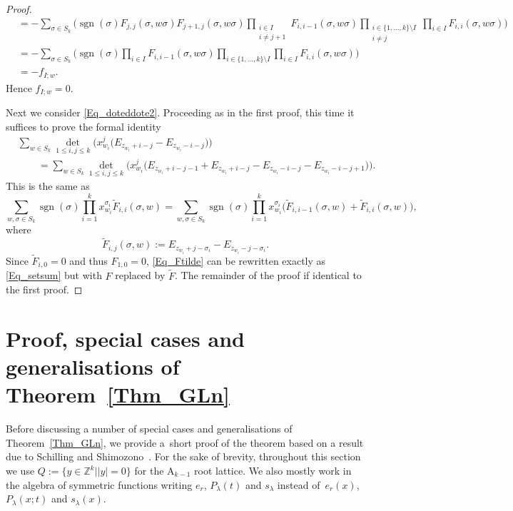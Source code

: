 \documentclass[pdftex]{sigma}
\numberwithin{equation}{section}
\renewcommand{\leq}{\leqslant}
\DeclareMathOperator{\sgn}{sgn}
\newcommand{\abs}[1]{\vert#1\vert}
\newcommand{\la}{\lambda}
\begin{document}
\begin{proof}
\begin{align*}
&=-\sum_{\sigma\in S_k}\biggl(\sgn(\sigma)
F_{j,j}(\sigma,w\sigma) F_{j+1,j}(\sigma,w\sigma)
\prod_{\substack{i\in I\\[1pt] i\neq j+1}}\! F_{i,i-1}(\sigma,w\sigma)
\!\prod_{\substack{i\in\{1,\dots,k\}\setminus I \\[1pt] i\neq j}}
\prod_{i\in I} F_{i,i}(\sigma,w\sigma)\biggr) \\
&=-\sum_{\sigma\in S_k}\biggl(\sgn(\sigma)
\prod_{i\in I} F_{i,i-1}(\sigma,w\sigma)
\prod_{i\in\{1,\dots,k\}\setminus I}
\prod_{i\in I} F_{i,i}(\sigma,w\sigma)\biggr) \\
&=-f_{I;w}.
\end{align*}
Hence $f_{I;w}=0$.

Next we consider \eqref{Eq_doteddote2}.
Proceeding as in the first proof, this time it suffices to
prove the formal identity
\begin{align*}
&\sum_{w\in S_k} \det_{1\leq i,j\leq k}\bigl(x_{w_i}^j
\bigl(E_{z_{w_i}+i-j}-E_{z_{w_i}-i-j}\bigr)\bigr) \\
&\qquad{}=\sum_{w\in S_k}\det_{1\leq i,j\leq k}\bigl(
x_{w_i}^j \bigl(E_{z_{w_i}+i-j-1}+E_{z_{w_i}+i-j}-
E_{z_{w_i}-i-j}-E_{z_{w_i}-i-j+1}\bigr)\bigr).
\end{align*}
This is the same as
\begin{equation}\label{Eq_Ftilde}
\sum_{w,\sigma\in S_k}\sgn(\sigma)
\prod_{i=1}^k x_{w_i}^{\sigma_i} \tilde{F}_{i,i}(\sigma,w)
=\sum_{w,\sigma\in S_k}\sgn(\sigma) \prod_{i=1}^k
x_{w_i}^{\sigma_i} \bigl( \tilde{F}_{i,i-1}(\sigma,w)+
\tilde{F}_{i,i}(\sigma,w)\bigr),
\end{equation}
where
\[
\tilde{F}_{i,j}(\sigma,w):=E_{z_{w_i}+j-\sigma_i}-E_{z_{w_i}-j-\sigma_i}.
\]
Since $\tilde{F}_{i,0}=0$ and thus $F_{1,0}=0$, \eqref{Eq_Ftilde}
can be rewritten exactly as \eqref{Eq_setsum} but with $F$ replaced
by $\tilde{F}$.
The remainder of the proof if identical to the first proof.
\end{proof}

\section{Proof, special cases and generalisations of Theorem~\ref{Thm_GLn}}
\label{Sec_GLn}

Before discussing a number of special cases and generalisations of
Theorem~\ref{Thm_GLn}, we provide a~short proof of the theorem based on
a result due to Schilling and Shimozono~\cite{SS00}.
For the sake of brevity, throughout this section we use
$Q:=\bigl\{y\in\mathbb{Z}^k\mid \abs{y}=0\bigr\}$ for the $\mathrm{A}_{k-1}$ root
lattice.
We also mostly work in the algebra of symmetric functions writing
$e_r$, $P_{\la}(t)$ and $s_{\la}$ instead of~$e_r(x)$,~$P_{\la}(x;t)$ and $s_{\la}(x)$.
\end{document}
